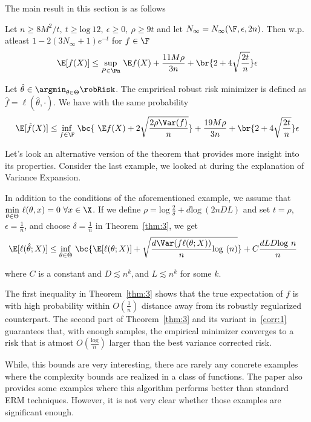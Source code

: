 The main result in this section is as follows
\begin{theorem}\label{thm:3}
  Let $n\ge 8M^2/t,~t\ge \mathrm{log}~12,~\epsilon\ge0,~\rho\ge 9t$
  and let $N_\infty = N_\infty(\F,\epsilon,2n)$. Then w.p. atleast $1 -
  2(3N_\infty +1)e^{-t}$ for $f\in\F$
  \[ \E[f(X)]\le \underset{P\in\Pn}{\mathrm{sup}}~\E f(X) +
    \dfrac{11M\rho}{3n} + \br{2 + 4\sqrt{\dfrac{2t}{n}}}\epsilon\]

  Let $\hat{\theta}\in\argmin_{\theta\in\Theta}\robRisk$. The
  emprirical robust risk minimizer is defined as $\hat{f} =
  \ell(\hat{\theta},\cdot)$. We have with the same probability 
 \[ \E[\hat{f}(X)]\le \underset{f\in\F}{\mathrm{inf}}~\bc{~\E f(X)  +
     2\sqrt{\dfrac{2\rho \Var(f)}{n}}}+
    \dfrac{19M\rho}{3n} + \br{ 2+ 4\sqrt{\dfrac{2t}{n}}}\epsilon\]
  
\end{theorem}
 Let's look an alternative version of the theorem that provides more
 insight into its properties. Consider the last example, we looked at
 during the explanation of Variance Expansion.

 In addition to the conditions of the aforementioned example, we
 assume that $\underset{\theta\in\Theta}{\mathrm{min}}~\ell(\theta, x)
 = 0~\forall x\in\X$. If we define $\rho =
 \mathrm{log}~\frac{2}{\delta} + d\mathrm{log}~(2nDL)$ and set
 $t=\rho$, $\epsilon=\frac{1}{n}$, and choose $\delta = \frac{1}{n}$
 in Theorem~\ref{thm:3}, we get
 \begin{align}
 \E[\ell(\hat{\theta}; X)] &\le
   \underset{\theta\in\Theta}{\mathrm{inf}}~\bc{\E[\ell(\theta; X)] + \sqrt{\frac{d\Var(f\ell(\theta;X))}{n}\mathrm{log}~(n)
     } }+ C\dfrac{dLD\mathrm{log}~n}{n}
   \label{corr:1}
 \end{align}

where $C$ is a constant and $D\lesssim n^k, $and $L\lesssim n^k$ for
some $k$.


The first inequality in Theorem~\ref{thm:3} shows that the true
expectation of $f$ is with high probability within $O(\frac{1}{n})$
distance away from its robustly regularized counterpart. The second
part of Theorem~\ref{thm:3} and its variant in~\eqref{corr:1}
guarantees that, with enough samples, the empirical minimizer
converges to a risk that is atmost $O(\frac{\mathrm{log}}{n})$
larger than the best variance corrected risk.

While, this bounds are very interesting, there are rarely any concrete
examples where the complexity bounds are realized in a class of
functions. The paper also provides some examples where this algorithm
performs better than standard ERM techniques. However, it is not very
clear whether those examples are significant enough.
